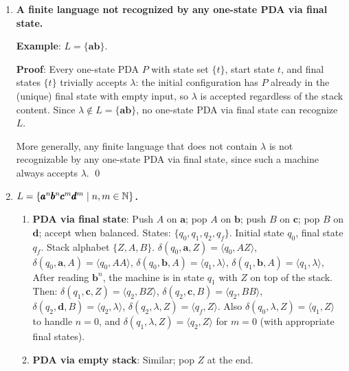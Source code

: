 \begin{enumerate}[{10.}1. ]
\begin{enumerate}
\textbf{Proof}: The same buffering construction applied to a DPDA for $L$ yields a DPDA for $h^{-1}(L)$, since the DPDA is deterministic and the buffering of $h(a)$ (a fixed string per input symbol $a$) preserves determinism. \qed
\end{enumerate}

\item \textbf{A finite language not recognized by any one-state PDA via final state.}

\textbf{Example}: $L = \{\pmb{ab}\}$.

\textbf{Proof}: Every one-state PDA $P$ with state set $\{t\}$, start state $t$, and final states $\{t\}$ trivially accepts $\lambda$: the initial configuration has $P$ already in the (unique) final state with empty input, so $\lambda$ is accepted regardless of the stack content. Since $\lambda \notin L = \{\pmb{ab}\}$, no one-state PDA via final state can recognize $L$.

More generally, any finite language that does not contain $\lambda$ is not recognizable by any one-state PDA via final state, since such a machine always accepts $\lambda$. \qed

\item \textbf{$L=\{\pmb{a}^n\pmb{b}^n\pmb{c}^m\pmb{d}^m \mid n,m\in\mathbb{N}\}$.}

\begin{enumerate}
\item \textbf{PDA via final state}: Push $A$ on $\pmb{a}$; pop $A$ on $\pmb{b}$; push $B$ on $\pmb{c}$; pop $B$ on $\pmb{d}$; accept when balanced.
States: $\{q_0,q_1,q_2,q_f\}$. Initial state $q_0$, final state $q_f$. Stack alphabet $\{Z,A,B\}$.
$\delta(q_0,\pmb{a},Z)=\langle q_0,AZ\rangle$, $\delta(q_0,\pmb{a},A)=\langle q_0,AA\rangle$,
$\delta(q_0,\pmb{b},A)=\langle q_1,\lambda\rangle$, $\delta(q_1,\pmb{b},A)=\langle q_1,\lambda\rangle$,
After reading $\pmb{b}^n$, the machine is in state $q_1$ with $Z$ on top of the stack. Then:
$\delta(q_1,\pmb{c},Z)=\langle q_2,BZ\rangle$, $\delta(q_2,\pmb{c},B)=\langle q_2,BB\rangle$,
$\delta(q_2,\pmb{d},B)=\langle q_2,\lambda\rangle$, $\delta(q_2,\lambda,Z)=\langle q_f,Z\rangle$.
Also $\delta(q_0,\lambda,Z)=\langle q_1,Z\rangle$ to handle $n=0$, and $\delta(q_1,\lambda,Z)=\langle q_2,Z\rangle$ for $m=0$ (with appropriate final states).

\item \textbf{PDA via empty stack}: Similar; pop $Z$ at the end.


\end{enumerate}
\end{enumerate}
